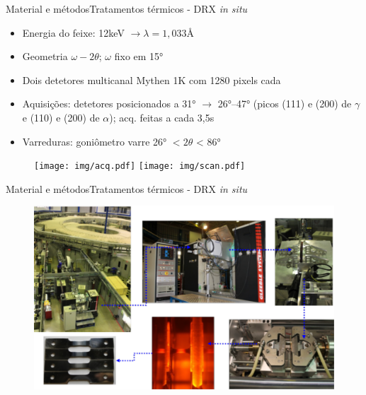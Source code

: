\begin{frame}{Material e métodos}{Tratamentos térmicos - DRX \textit{in situ}}
	\begin{itemize}
		\item Energia do feixe: 12keV $\rightarrow \lambda=1,033$\AA
		\item Geometria $\omega-2\theta$; $\omega$ fixo em 15°
		\item Dois detetores multicanal Mythen 1K com 1280 pixels cada
		\item Aquisições: detetores posicionados a 31° $\rightarrow$ 26°--47° (picos (111) e (200) de $\gamma$ e (110) e (200) de $\alpha$); acq. feitas a cada 3,5s
		\item Varreduras: goniômetro varre 26° $< 2\theta$ < 86°
	\end{itemize}

	\begin{figure}
	\texttt{[image: img/acq.pdf]}
	\texttt{[image: img/scan.pdf]}
	\end{figure}
\end{frame}

\begin{frame}{Material e métodos}{Tratamentos térmicos - DRX \textit{in situ}}
	\begin{figure}
		\centering
		\includegraphics[width=\textwidth]{./img/XTMS_facilities.pdf}
	\end{figure}
\end{frame}
